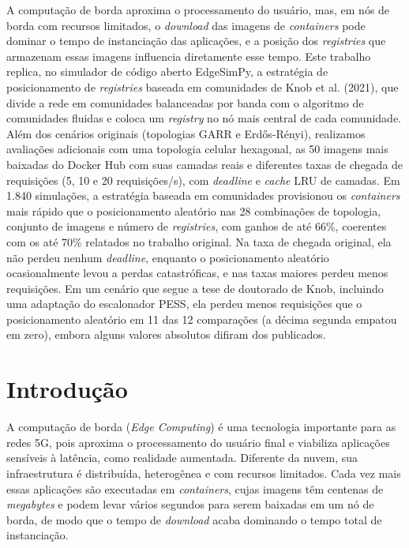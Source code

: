 \documentclass[12pt]{article}
\begin{document}
\begin{resumo}
  A computação de borda aproxima o processamento do usuário, mas, em nós de
  borda com recursos limitados, o \textit{download} das imagens de
  \textit{containers} pode dominar o tempo de instanciação das aplicações, e a
  posição dos \textit{registries} que armazenam essas imagens influencia
  diretamente esse tempo. Este trabalho replica, no simulador de código aberto
  EdgeSimPy, a estratégia de posicionamento de \textit{registries} baseada em
  comunidades de Knob et al. (2021), que divide a rede em comunidades
  balanceadas por banda com o algoritmo de comunidades fluidas e coloca um
  \textit{registry} no nó mais central de cada comunidade. Além dos cenários
  originais (topologias GARR e Erdős-Rényi), realizamos avaliações adicionais
  com uma topologia celular hexagonal, as 50 imagens mais baixadas do Docker Hub
  com suas camadas reais e diferentes taxas de chegada de requisições (5, 10 e
  20 requisições/s), com \textit{deadline} e \textit{cache} LRU de camadas. Em
  1.840 simulações, a estratégia baseada em comunidades provisionou os
  \textit{containers} mais rápido que o posicionamento aleatório nas 28
  combinações de topologia, conjunto de imagens e número de
  \textit{registries}, com ganhos de até 66\%, coerentes com os até 70\%
  relatados no trabalho original. Na taxa de chegada original, ela não perdeu
  nenhum \textit{deadline}, enquanto o posicionamento aleatório ocasionalmente
  levou a perdas catastróficas, e nas taxas maiores perdeu menos requisições.
  Em um cenário que segue a tese de doutorado de Knob, incluindo uma adaptação
  do escalonador PESS, ela perdeu menos requisições que o posicionamento
  aleatório em 11 das 12 comparações (a décima segunda empatou em zero), embora
  alguns valores absolutos difiram dos publicados.
\end{resumo}

\section{Introdução}

A computação de borda (\textit{Edge Computing}) é uma tecnologia importante para
as redes 5G, pois aproxima o processamento do usuário final e viabiliza
aplicações sensíveis à latência, como realidade aumentada. Diferente da nuvem,
sua infraestrutura é distribuída, heterogênea e com recursos limitados. Cada vez
mais essas aplicações são executadas em \textit{containers}, cujas imagens têm
centenas de \textit{megabytes} e podem levar vários segundos para serem baixadas
em um nó de borda, de modo que o tempo de \textit{download} acaba dominando o
tempo total de instanciação.
\end{document}
